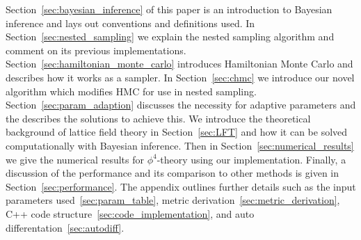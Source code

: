 \documentclass[11pt]{article}
\begin{document}
    Section~\ref{sec:bayesian_inference} of this paper is an introduction to Bayesian inference and lays out conventions
    and definitions used.
    In Section~\ref{sec:nested_sampling} we explain the nested sampling algorithm and comment on its
    previous implementations.
    Section~\ref{sec:hamiltonian_monte_carlo} introduces Hamiltonian Monte Carlo and describes how it works as a sampler.
    In Section~\ref{sec:chmc} we introduce our novel algorithm which modifies HMC for use in nested sampling.
    Section~\ref{sec:param_adaption} discusses the necessity for adaptive parameters and the describes the solutions
    to achieve this.
    We introduce the theoretical background of lattice field theory in Section~\ref{sec:LFT} and how it can be
    solved computationally with Bayesian inference.
    Then in Section~\ref{sec:numerical_results} we give the numerical results for $\phi^4$-theory
    using our implementation.
    Finally, a discussion of the performance and its comparison to other methods is given in Section~\ref{sec:performance}.
    The appendix outlines further details such as the input parameters used~\ref{sec:param_table},
    metric derivation~\ref{sec:metric_derivation}, C++ code structure~\ref{sec:code_implementation},
    and auto differentation~\ref{sec:autodiff}.
\end{document}
